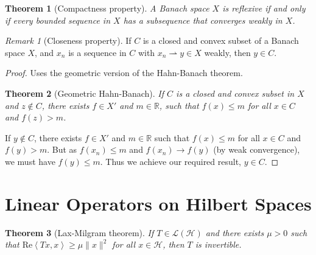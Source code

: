 \documentclass[10pt, oneside, reqno]{amsart}
\theoremstyle{plain}%
\newtheorem{thm}{Theorem}[section]
\numberwithin{equation}{section}
\theoremstyle{definition}
\theoremstyle{remark}
\newtheorem*{rem}{Remark}
\newcommand{\R}{\mathbb{R}}
\newcommand{\iprod}[1]{\left\langle #1 \right\rangle}
\renewcommand{\Re}{\text{Re}}
\begin{document}
\begin{thm}[Compactness property]
	A Banach space $X$ is reflexive if and only if every bounded sequence in $X$ has a subsequence that converges weakly in $X$.
\end{thm}

\begin{rem}[Closeness property]
	If $C$ is a closed and convex subset of a Banach space $X$, and $x_n$ is a sequence in $C$ with $x_n \rightharpoonup y \in X$ weakly, then $y \in C$.   
\end{rem}

\begin{proof}
	Uses the geometric version of the Hahn-Banach theorem. 
	
	\begin{thm}[Geometric Hahn-Banach]
		If $C$ is a closed and convex subset in $X$ and $z \notin C$, there exists $f \in X'$ and $m \in \R$, such that $f(x) \leq m$ for all $x \in C$ and $f(z) > m$. 
	\end{thm}
	
	If $y \notin C$, there exists $f \in X'$ and $m \in \R$ such that $f(x) \leq m$ for all $x \in C$ and $f(y) > m$.  But as $f(x_n) \leq m$ and $f(x_n) \rightarrow f(y)$ (by weak convergence), we must have $f(y) \leq m$.  Thus we achieve our required result, $y \in C$.  
\end{proof}


\section{Linear Operators on Hilbert Spaces} %
\label{sec:linear_operators_on_hilbert_spaces}

\begin{thm}[Lax-Milgram theorem]
	\label{thm:lax_milgram}
	If $T \in \mathcal L(\mathcal H)$ and there exists $\mu > 0$ such that $\Re \iprod{Tx, x} \geq \mu \| x \|^2$ for all $x \in \mathcal H$, then $T$ is invertible.  
\end{thm}
\end{document}

